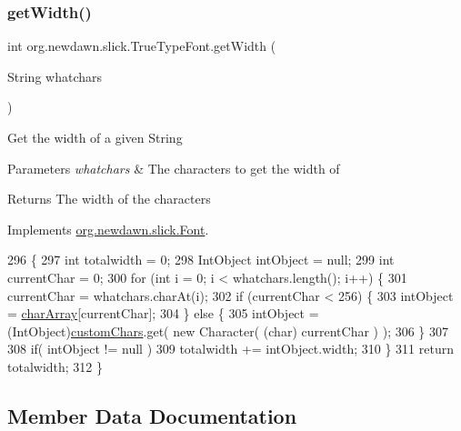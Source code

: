 \subsubsection{\texorpdfstring{get\+Width()}{getWidth()}}
{\footnotesize\ttfamily int org.\+newdawn.\+slick.\+True\+Type\+Font.\+get\+Width (\begin{DoxyParamCaption}\item[{String}]{whatchars }\end{DoxyParamCaption})\hspace{0.3cm}{\ttfamily [inline]}}

Get the width of a given String


\begin{DoxyParams}{Parameters}
{\em whatchars} & The characters to get the width of\\
\hline
\end{DoxyParams}
\begin{DoxyReturn}{Returns}
The width of the characters 
\end{DoxyReturn}


Implements \mbox{\hyperlink{interfaceorg_1_1newdawn_1_1slick_1_1_font_a6dbdd5828730e18fcf0612307d0394b1}{org.\+newdawn.\+slick.\+Font}}.


\begin{DoxyCode}
296                                           \{
297         \textcolor{keywordtype}{int} totalwidth = 0;
298         IntObject intObject = null;
299         \textcolor{keywordtype}{int} currentChar = 0;
300         \textcolor{keywordflow}{for} (\textcolor{keywordtype}{int} i = 0; i < whatchars.length(); i++) \{
301             currentChar = whatchars.charAt(i);
302             \textcolor{keywordflow}{if} (currentChar < 256) \{
303                 intObject = \mbox{\hyperlink{classorg_1_1newdawn_1_1slick_1_1_true_type_font_ae10a9ca17036288b7f76bd7ca10e4ea6}{charArray}}[currentChar];
304             \} \textcolor{keywordflow}{else} \{
305                 intObject = (IntObject)\mbox{\hyperlink{classorg_1_1newdawn_1_1slick_1_1_true_type_font_a9043b8f092d2d1b8c7d65a4518fc4d3f}{customChars}}.get( \textcolor{keyword}{new} Character( (\textcolor{keywordtype}{char}) currentChar ) );
306             \}
307             
308             \textcolor{keywordflow}{if}( intObject != null )
309                 totalwidth += intObject.width;
310         \}
311         \textcolor{keywordflow}{return} totalwidth;
312     \}
\end{DoxyCode}


\subsection{Member Data Documentation}
\mbox{\label{classorg_1_1newdawn_1_1slick_1_1_true_type_font_a1dc8e98ba06633544ec9f69c434dc126}} 
